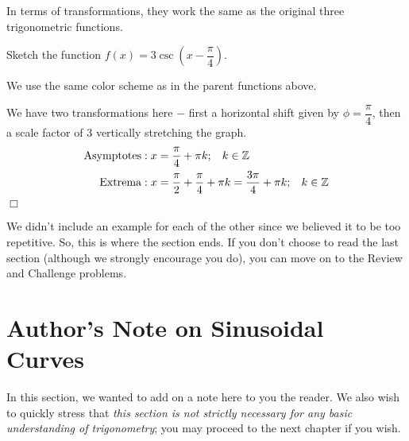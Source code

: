 \documentclass[../book.tex]{subfiles}
\begin{document}
\begin{wrapfigure}{r}{5cm}
\end{wrapfigure}

In terms of transformations, they work the same as the original three trigonometric functions.

\begin{example}
Sketch the function $f(x)=3\csc\left(x-\dfrac{\pi}{4}\right)$.
\end{example}
\begin{solution}
We use the same color scheme as in the parent functions above.

We have two transformations here $-$ first a horizontal shift given by $\phi=\dfrac{\pi}{4}$, then a scale factor of $3$ vertically stretching the graph.
\begin{align*}
    \text{Asymptotes}&: x=\dfrac{\pi}{4}+\pi k;\hspace{3mm} k\in\mathbb{Z} \\
    \text{Extrema}&: x=\dfrac{\pi}{2}+\dfrac{\pi}{4}+\pi k=\dfrac{3\pi}{4}+\pi k;\hspace{3mm} k\in\mathbb{Z}
\end{align*} $\Box$
\end{solution}
We didn't include an example for each of the other since we believed it to be too repetitive.  So, this is where the section ends.  If you don't choose to read the last section (although we strongly encourage you do), you can move on to the Review and Challenge problems.
\section{Author's Note on Sinusoidal Curves}
\noindent In this section, we wanted to add on a note here to you the reader. We also wish to quickly stress that \textit{this section is not strictly necessary for any basic understanding of trigonometry}; you may proceed to the next chapter if you wish.
\end{document}
